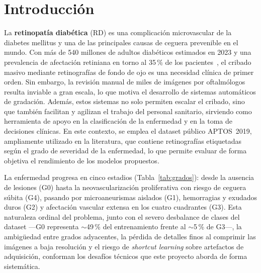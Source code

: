 \documentclass[12pt, a4paper]{article}
\begin{document}
\newpage
{}

\section{Introducción}

La \textbf{retinopatía diabética} (RD) es una complicación microvascular de la
diabetes mellitus y una de las principales causas de ceguera prevenible en el mundo.
Con más de 540 millones de adultos diabéticos estimados en 2023 y una prevalencia
de afectación retiniana en torno al 35\,\% de los pacientes~\cite{idf2023,who2023},
el cribado masivo mediante retinografías de fondo de ojo es una necesidad clínica
de primer orden. Sin embargo, la revisión manual de miles de imágenes por
oftalmólogos resulta inviable a gran escala, lo que motiva el desarrollo de sistemas
automáticos de gradación. Además, estos sistemas no solo permiten escalar el
cribado, sino que también facilitan y agilizan el trabajo del personal sanitario,
sirviendo como herramienta de apoyo en la clasificación de la enfermedad y en la
toma de decisiones clínicas. En este contexto, se emplea el dataset público APTOS~2019,
ampliamente utilizado en la literatura, que contiene retinografías etiquetadas según
el grado de severidad de la enfermedad, lo que permite evaluar de forma objetiva el
rendimiento de los modelos propuestos.

La enfermedad progresa en cinco estadios (Tabla~\ref{tab:grados}): desde la ausencia
de lesiones (G0) hasta la neovascularización proliferativa con riesgo de ceguera súbita
(G4), pasando por microaneurismas aislados (G1), hemorragias y exudados duros (G2) y
afectación vascular extensa en los cuatro cuadrantes (G3). Esta naturaleza ordinal del
problema, junto con el severo desbalance de clases del dataset ---G0 representa
$\sim$49\,\% del entrenamiento frente al $\sim$5\,\% de G3---, la ambigüedad entre
grados adyacentes, la pérdida de detalles finos al comprimir las imágenes a baja
resolución y el riesgo de \textit{shortcut learning} sobre artefactos de adquisición,
conforman los desafíos técnicos que este proyecto aborda de forma sistemática.
\end{document}
